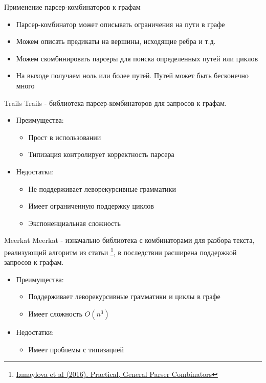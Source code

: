 \documentclass[aspectratio=169]{beamer}
\begin{document}
\begin{frame}{Применение парсер-комбинаторов к графам}
  \begin{itemize}
    \item Парсер-комбинатор может описывать ограничения на пути в графе
    \item Можем описать предикаты на вершины, исходящие ребра и т.д.
    \item Можем скомбинировать парсеры для поиска определенных путей или циклов
    \item На выходе получаем ноль или более путей. Путей может быть бесконечно много
  \end{itemize}
\end{frame}

\begin{frame}{Trails}
  Trails - библиотека парсер-комбинаторов для запросов к графам.
  \begin{itemize}
    \item Преимущества:
          \begin{itemize}
            \item Прост в использовании
            \item Типизация контролирует корректность парсера
          \end{itemize}
          \vspace{0.5cm}
    \item Недостатки:
          \begin{itemize}
            \item Не поддерживает леворекурсивные грамматики
            \item Имеет ограниченную поддержку циклов
            \item Экспоненциальная сложность
          \end{itemize}
  \end{itemize}
\end{frame}

\begin{frame}{Meerkat}
  Meerkat - изначально библиотека с комбинаторами для разбора текста, реализующий алгоритм из статьи \footnote{\href{https://dl.acm.org/doi/10.1145/2847538.2847539}
    {Izmaylova et al (2016). Practical, General Parser Combinators}}, в последствии расширена поддержкой запросов к графам.
  \begin{itemize}
    \item Преимущества:
          \begin{itemize}
            \item Поддерживает леворекурсивные грамматики и циклы в графе
            \item Имеет сложность $O(n^3)$
          \end{itemize}
          \vspace{0.5cm}
    \item Недостатки:
          \begin{itemize}
            \item Имеет проблемы с типизацией
          \end{itemize}
  \end{itemize}
\end{frame}
\end{document}
